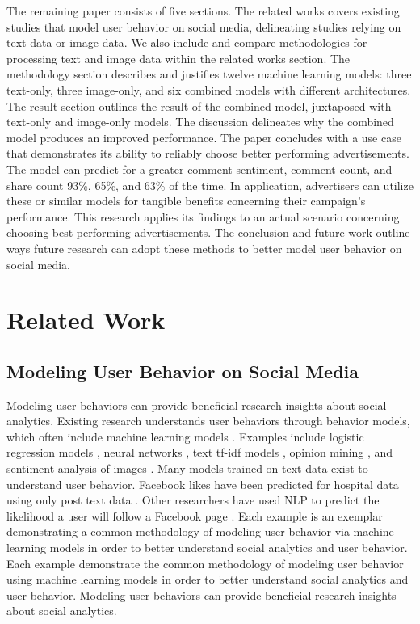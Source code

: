 \documentclass[mksc,blindrev]{informs3} %
\begin{document}
The remaining paper consists of five sections. The related works covers existing
studies that model user behavior on social media, delineating studies relying on text data or image data. We also include  and compare methodologies for processing text and image data within the related works section. The methodology section describes and justifies twelve machine learning models: three text-only, three image-only, and six combined models with different architectures. The result section outlines the result of the combined model, juxtaposed with text-only and image-only models. The discussion delineates why
the combined model produces an improved performance. The paper concludes with a use case that demonstrates its ability to reliably choose better performing advertisements. The model can predict for a greater comment sentiment, comment count, and share count 93\%, 65\%, and 63\% of the time. In application, advertisers can utilize these or similar models for tangible benefits concerning their campaign’s performance. This research applies its findings to an actual scenario concerning choosing best performing advertisements. The conclusion and future work outline ways future research can adopt these methods to better model user behavior on social media.


\section{Related Work}

\subsection{Modeling User Behavior on Social Media}

Modeling user behaviors can provide beneficial research insights about social analytics. Existing research understands user behaviors through behavior models, which often include machine learning models \cite{Hudson2020, 8029313, Xing2021ComputationalMF, Aggarwal2017AHA, Liu2012, Li2015}.  Examples include logistic regression models \cite{Li2015}, neural networks \cite{8029313}, text tf-idf models \cite{Ohsawa2013}, opinion mining \cite{Aggarwal2017AHA, Liu2012}, and sentiment analysis of images \cite{Wang2015}. Many models trained on text data exist to understand user behavior. Facebook likes have been predicted for hospital data using only post text data \cite{Nash2017}. Other researchers have used NLP to predict the likelihood a user will follow a Facebook page \cite{Xing2021ComputationalMF, Ohsawa2013}. Each example is an exemplar demonstrating a common methodology of modeling user behavior via machine learning models in order to better understand social analytics and user behavior. Each  example demonstrate the common methodology of modeling user behavior using machine learning models in order to better understand social analytics and user behavior. Modeling user behaviors can provide beneficial research insights about social analytics.
\end{document}
